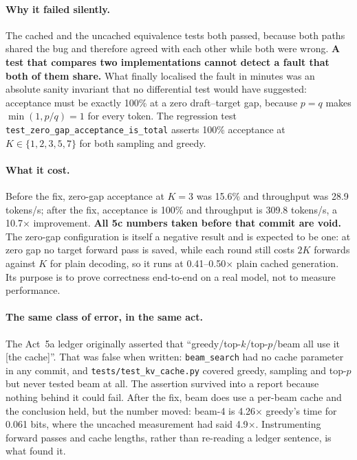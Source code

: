 \documentclass[11pt,a4paper]{article}
\begin{document}
\paragraph{Why it failed silently.} The cached and the uncached equivalence
tests both passed, because both paths shared the bug and therefore agreed with
each other while both were wrong. \textbf{A test that compares two
implementations cannot detect a fault that both of them share.} What finally
localised the fault in minutes was an absolute sanity invariant that no
differential test would have suggested: acceptance must be exactly 100\% at a
zero draft--target gap, because $p = q$ makes $\min(1, p/q) = 1$ for every
token. The regression test \texttt{test\_zero\_gap\_acceptance\_is\_total}
asserts 100\% acceptance at $K \in \{1,2,3,5,7\}$ for both sampling and greedy.

\paragraph{What it cost.} Before the fix, zero-gap acceptance at $K = 3$ was
15.6\% and throughput was 28.9 tokens/s; after the fix, acceptance is 100\% and
throughput is 309.8 tokens/s, a 10.7$\times$ improvement. \textbf{All 5c numbers
taken before that commit are void.} %
 The zero-gap configuration is itself a
negative result and is expected to be one: at zero gap no target forward pass
is saved, while each round still costs $2K$ forwards against $K$ for plain
decoding, so it runs at 0.41--0.50$\times$ plain cached generation. Its
purpose is to prove correctness end-to-end on a real model, not to measure
performance.

\paragraph{The same class of error, in the same act.} The Act~5a ledger
originally asserted that ``greedy/top-$k$/top-$p$/beam all use it [the cache]''.
That was false when written: \texttt{beam\_search} had no cache parameter in
any commit, and \texttt{tests/test\_kv\_cache.py} covered greedy, sampling and
top-$p$ but never tested beam at all. The assertion survived into a report
because nothing behind it could fail. After the fix, beam does use a
per-beam cache and the conclusion held, but the number moved: beam-4 is
4.26$\times$ greedy's time for 0.061 bits, where the uncached measurement had
said 4.9$\times$. Instrumenting forward passes and cache lengths, rather than
re-reading a ledger sentence, is what found it.
\end{document}
